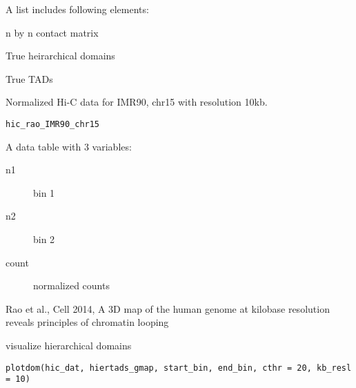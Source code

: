 \documentclass[a4paper]{book}
\begin{document}
%
\begin{Value}
A list includes following elements:
\begin{ldescription}
\item[\code{hic\_mat}] n by n contact matrix
\item[\code{hierTads}] True heirarchical domains
\item[\code{tads\_true}] True TADs
\end{ldescription}
\end{Value}
%
\begin{Description}\relax
Normalized Hi-C data for IMR90, chr15 with resolution 10kb.
\end{Description}
%
\begin{Usage}
\begin{verbatim}
hic_rao_IMR90_chr15
\end{verbatim}
\end{Usage}
%
\begin{Format}
A data table with 3 variables:
\begin{description}

\item[n1] bin 1
\item[n2] bin 2
\item[count] normalized counts

\end{description}
\end{Format}
%
\begin{Source}\relax
Rao et al., Cell 2014, A 3D map of the human genome at kilobase resolution reveals principles of chromatin looping
\end{Source}
%
\begin{Description}\relax
visualize hierarchical domains
\end{Description}
%
\begin{Usage}
\begin{verbatim}
plotdom(hic_dat, hiertads_gmap, start_bin, end_bin, cthr = 20, kb_resl = 10)
\end{verbatim}
\end{Usage}
%
\end{document}
